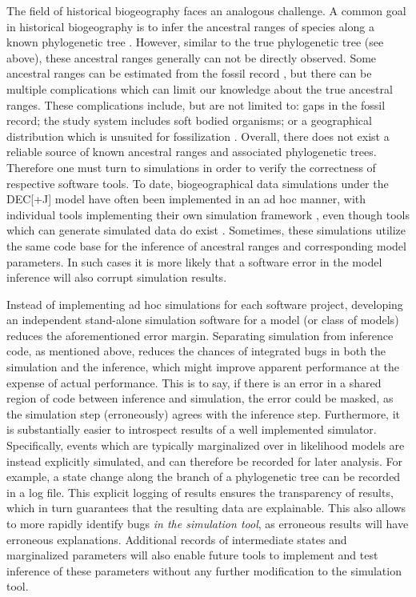 \documentclass[a4paper]{article}
\begin{document}
The field of historical biogeography faces an analogous challenge.
A common goal in historical biogeography is to infer the ancestral ranges of species along a known phylogenetic tree
\citep{varela_phylogeny_2019, baker_global_2013, vicente_and_2017}.
However, similar to the true phylogenetic tree (see above), these ancestral ranges generally can not be directly observed.
Some ancestral ranges can be estimated from the fossil record \cite{mclachlan_reconstructing_2004}, but there can be multiple
complications which can limit our knowledge about the true ancestral ranges.
These complications include, but are not limited to: gaps in the fossil record; the study system includes soft bodied
organisms; or a geographical distribution which is unsuited for fossilization \cite{kidwell_quality_2002}.
Overall, there does not exist a reliable source of known ancestral ranges and associated phylogenetic trees. 
Therefore one must turn to simulations in order to verify the correctness of respective software tools.
To date, biogeographical data simulations under the DEC[+J] model have often been implemented in an ad hoc manner,
with individual tools implementing their own simulation framework \cite{matzke_statistical_2022,
bettisworth_lagrange-ng_2023}, even though tools which can generate simulated data do exist \cite{hohna_revbayes_2016}.
Sometimes, these simulations utilize the same code base for the inference of ancestral ranges and corresponding model parameters.
In such cases it is more likely that a software error in the model inference will also corrupt simulation results.

Instead of implementing ad hoc simulations for each software project, developing an independent stand-alone 
simulation software for a model (or class of models) reduces the aforementioned error margin.
Separating simulation from inference code, as mentioned above, reduces the chances of integrated bugs in both the simulation
and the inference, which might improve apparent performance at the expense of actual performance.
This is to say, if there is an error in a shared region of code between inference and simulation, the error could be
masked, as the simulation step (erroneously) agrees with the inference step.
Furthermore, it is substantially easier to introspect results of a well implemented simulator.
Specifically, events which are typically marginalized over in likelihood models are instead explicitly simulated, and can therefore be recorded for later analysis.
For example, a state change along the branch of a phylogenetic tree can be recorded in a log file.
This explicit logging of results ensures the transparency of results, which in turn guarantees that the resulting data are
explainable.
This also allows to more rapidly identify bugs \textit{in the simulation tool}, as erroneous results will have erroneous explanations.
Additional records of intermediate states and marginalized parameters will also enable future tools to implement and test inference of
these parameters without any further modification to the simulation tool.
\end{document}
